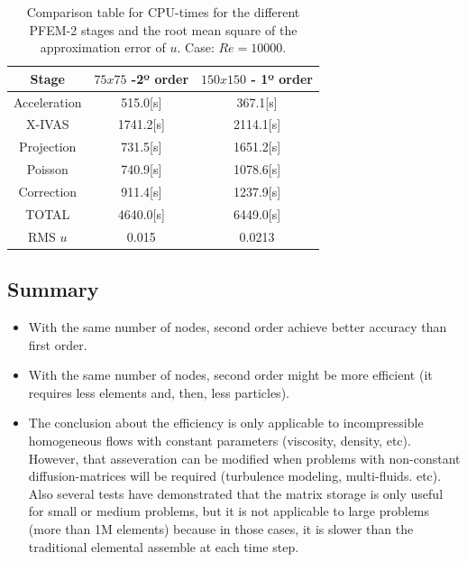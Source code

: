 \documentclass[a4paper,conference]{IEEEtran}
\begin{document}
\begin{table}[htbp]
\begin{center}
{\footnotesize
\begin{tabular}[h]{||c|c|c||}
    \hline
      Stage & $75x75$  -2º order & $150x150$ - 1º order\\
      \hline
      \hline
	Acceleration & 515.0[s]& 367.1[s]\\
	X-IVAS & 1741.2[s]& 2114.1[s] \\
	Projection & 731.5[s]& 1651.2[s]\\
	Poisson & 740.9[s]& 1078.6[s]\\
	Correction & 911.4[s]& 1237.9[s]\\
      \hline
	TOTAL & 4640.0[s]& 6449.0[s]\\
      \hline
      \hline
	RMS $u$ & 0.015 & 0.0213 \\
      \hline
      \hline
\end{tabular}
}
\caption{\label{Tabla:times_Re_10000} Comparison table for CPU-times for the different PFEM-2 stages and the root mean square of the approximation error of $u$. Case: $Re=10000$.}
\end{center}
\end{table}

\newpage

\subsection{Summary}

  \begin{itemize}
   \item With the same number of nodes, second order achieve better accuracy than first order. 
   \item With the same number of nodes, second order might be more efficient (it requires less elements and, then, less particles).
   \item The conclusion about the efficiency is only applicable to incompressible homogeneous flows with constant parameters (viscosity, density, etc). However, that asseveration can be modified when problems with non-constant diffusion-matrices will be required (turbulence modeling, multi-fluids. etc). Also several tests have demonstrated that the matrix storage is only useful for small or medium problems, but it is not applicable to large problems (more than 1M elements) because in those cases, it is slower than the traditional elemental assemble at each time step.
  \end{itemize}
  
\end{document}
